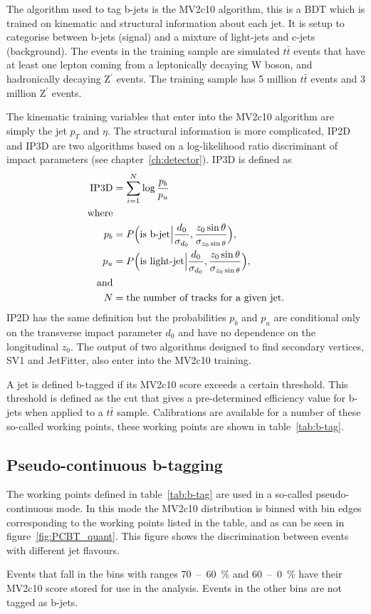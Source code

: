 The algorithm used to tag b-jets is the MV2c10 algorithm, this is a BDT which is
trained on kinematic and structural information about each jet. It is setup to
categorise between b-jets (signal) and a mixture of light-jets and c-jets
(background). The events in the training sample are simulated $t\bar{t}$ events
that have at least one lepton coming from a leptonically decaying W boson, and
hadronically decaying Z$^\prime$ events. The training sample has 5 million
$t\bar{t}$ events and 3 million Z$^\prime$ events.

The kinematic training variables that enter into the MV2c10 algorithm are simply
the jet $p_T$ and $\eta$. The structural information is more complicated, IP2D
and IP3D are two algorithms based on a log-likelihood ratio discriminant of
impact parameters (see chapter~\ref{ch:detector}). IP3D is defined as
\begin{align}
  \text{IP3D} &=\sum_{i=1}^{N}\log{\frac{p_b}{p_u}} \\
  \text{where}& \notag \\
  p_b &= P\Big(\text{is b-jet} \Big\vert \frac{d_0}{\sigma_{d_0}}, \frac{z_0 \sin{\theta}}{\sigma_{z_0\sin{\theta}}}\Big),\\
  p_u &= P\Big(\text{is light-jet} \Big\vert \frac{d_0}{\sigma_{d_0}}, \frac{z_0 \sin{\theta}}{\sigma_{z_0\sin{\theta}}}\Big),\\
  \text{and} & \notag \\
  N &= \text{the number of tracks for a given jet.} \notag
\end{align}
IP2D has the same definition but the probabilities $p_b$ and $p_u$ are
conditional only on the transverse impact parameter $d_0$ and have no dependence
on the longitudinal $z_0$. The output of two algorithms designed to find
secondary vertices, SV1 and JetFitter, also enter into the MV2c10 training.

A jet is defined b-tagged if its MV2c10 score exceeds a certain threshold. This
threshold is defined as the cut that gives a pre-determined efficiency value for
b-jets when applied to a $t\bar{t}$ sample. Calibrations are available for a
number of these so-called working points, these working points are shown in
table~\ref{tab:b-tag}.



\subsection{Pseudo-continuous b-tagging}
The working points defined in table~\ref{tab:b-tag} are used in a so-called
pseudo-continuous mode. In this mode the MV2c10 distribution is binned with bin
edges corresponding to the working points listed in the table, and as can be
seen in figure~\ref{fig:PCBT_quant}. This figure shows the discrimination between
events with different jet flavours. 

Events that fall in the bins with ranges 70~--~60~\% and 60~--~0~\% have their
MV2c10 score stored for use in the analysis. Events in the other bins are not
tagged as b-jets.

